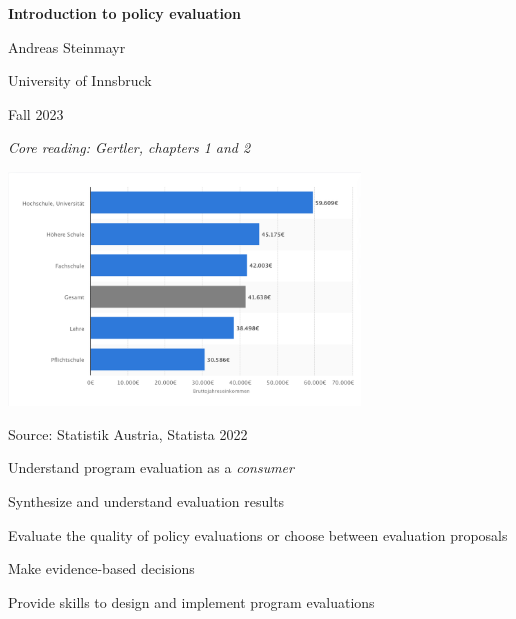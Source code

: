 \documentclass[
  25pt,         %
  a4paper,
  landscape,
  Screen4to3,
  footrule ]{foils}
\renewcommand{\pause}{}
\newcommand{\xx}{\item[{\small $\bullet$}]}
\begin{document}
\setlength{\parindent}{0pt}



\thispagestyle{empty}

\begin{center}

\textbf{Introduction to policy evaluation} \\
  \bigskip  \bigskip \bigskip
 \bigskip \bigskip \bigskip


Andreas Steinmayr \\ 
 \bigskip \bigskip \bigskip

University of Innsbruck \bigskip

Fall 2023 \\ \bigskip  \bigskip \bigskip \bigskip


\end{center}

\small{\textit{Core reading: Gertler, chapters 1 and 2}}




\setcounter{page}{0}


\begin{center}
\includegraphics[width=0.7\textwidth]{figures/earnings_austria_2017}
\end{center}
{\tiny Source: Statistik Austria, Statista 2022}


\bi 
\x Understand program evaluation as a \textit{consumer}
\bi
\xx Synthesize and understand evaluation results
\xx Evaluate the quality of policy evaluations or choose between evaluation proposals
\xx Make evidence-based decisions
\ei
\pause
\x Provide skills to design and implement program evaluations
\end{document}
